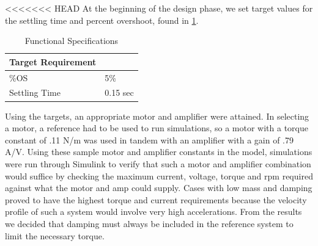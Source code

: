 <<<<<<< HEAD
At the beginning of the design phase, we set target values for the settling time and percent overshoot, found in \ref{specs}.
\begin{table}[H]
	\centering
	\caption{Functional Specifications}
	\label{specs}
	\begin{tabular}{|l|l|}
		\hline
		Target Requirement &          \\ \hline
		\%OS               & 5\%      \\ \hline
		Settling Time      & 0.15 sec \\ \hline
	\end{tabular}
\end{table}
 Using the targets, an appropriate motor and amplifier were attained. In selecting a motor, a reference had to be used to run simulations, so a motor with a torque constant of .11 N/m was used in tandem with an amplifier with a gain of .79 A/V. Using these sample motor and amplifier constants in the model, simulations were run through Simulink to verify that such a motor and amplifier combination would suffice by checking the maximum current, voltage, torque and rpm required against what the motor and amp could supply. Cases with low mass and damping proved to have the highest torque and current requirements because the velocity profile of such a system would involve very high accelerations. From the results we decided that damping must always be included in the reference system to limit the necessary torque. \par
